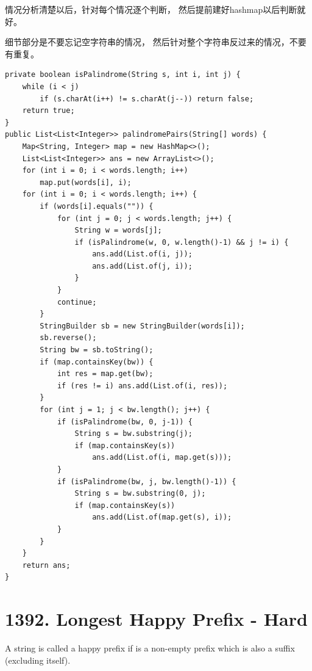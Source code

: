 \documentclass[9pt, b5paaper]{book}
\begin{document}
情况分析清楚以后，针对每个情况逐个判断， 然后提前建好hashmap以后判断就好。

细节部分是不要忘记空字符串的情况， 然后针对整个字符串反过来的情况，不要有重复。
\begin{verbatim}
private boolean isPalindrome(String s, int i, int j) {
    while (i < j) 
        if (s.charAt(i++) != s.charAt(j--)) return false;
    return true;
}
public List<List<Integer>> palindromePairs(String[] words) {
    Map<String, Integer> map = new HashMap<>();
    List<List<Integer>> ans = new ArrayList<>();
    for (int i = 0; i < words.length; i++) 
        map.put(words[i], i);
    for (int i = 0; i < words.length; i++) {
        if (words[i].equals("")) {
            for (int j = 0; j < words.length; j++) {
                String w = words[j];
                if (isPalindrome(w, 0, w.length()-1) && j != i) {
                    ans.add(List.of(i, j));
                    ans.add(List.of(j, i));
                }
            }
            continue;
        }
        StringBuilder sb = new StringBuilder(words[i]);
        sb.reverse();
        String bw = sb.toString();
        if (map.containsKey(bw)) {
            int res = map.get(bw);
            if (res != i) ans.add(List.of(i, res));
        }
        for (int j = 1; j < bw.length(); j++) {
            if (isPalindrome(bw, 0, j-1)) {
                String s = bw.substring(j);
                if (map.containsKey(s))
                    ans.add(List.of(i, map.get(s)));
            }
            if (isPalindrome(bw, j, bw.length()-1)) {
                String s = bw.substring(0, j);
                if (map.containsKey(s))
                    ans.add(List.of(map.get(s), i));
            }
        }
    }
    return ans;
}
\end{verbatim}

\section{1392. Longest Happy Prefix - Hard}
\label{sec-3-3}
A string is called a happy prefix if is a non-empty prefix which is also a suffix (excluding itself).
\end{document}
